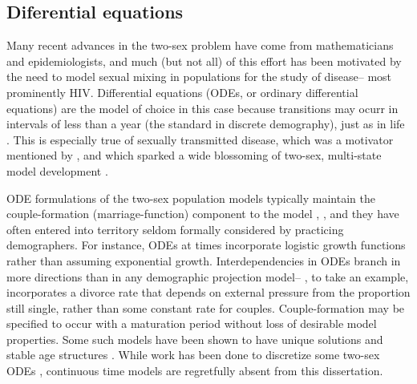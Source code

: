 \subsection{Diferential equations} 
Many recent advances in the two-sex problem
have come from mathematicians and epidemiologists, and much (but not all) of
this effort has been motivated by the need to model sexual mixing in
populations for the study of disease-- most prominently HIV. Differential
equations (ODEs, or ordinary differential equations) are the model of choice in
this case because transitions may ocurr in intervals of less than a year 
(the standard in discrete demography), just as in
life \citep{hoppensteadt1975mathematical}. This is especially true of sexually
transmitted disease, which was a motivator mentioned by \citet{hadeler1988models}, and which sparked a wide blossoming
of two-sex, multi-state model development
\citep{dietz1988epidemiological,hadeler1989pair,busenberg1991general,blythe1991toward}.

ODE formulations of the two-sex population models typically maintain the
couple-formation (marriage-function) component to the model
\citep{Fredrickson1971,inaba1992age}, 
\citep[see e.g.][for a good overview]{ianelli2005gender}, and they have often entered into
territory seldom formally considered by practicing demographers. For instance,
ODEs at times incorporate logistic growth
functions\citep{castillo1995logistic,yang2009logisticwb,yang2009logistic} rather
than assuming exponential growth\citep{martcheva1999exponential}. Interdependencies in ODEs branch in more directions than in any demographic
projection model-- \citet{maxin2010two}, to take an example, incorporates a
divorce rate that depends on external pressure from the proportion still single,
rather than some constant rate for couples. Couple-formation may be
specified to occur with a maturation period without
loss of desirable model properties\citep{hadeler1993pair}. Some such models have
been shown to have unique solutions \citep{martcheva1999two} and stable age
structures \citep{inaba2000persistent}. While work has been done to
discretize some two-sex ODEs \citep{arbogast1989finite,
martcheva2001mathematics, ianelli2005gender}, continuous time models are
regretfully absent from this dissertation.

